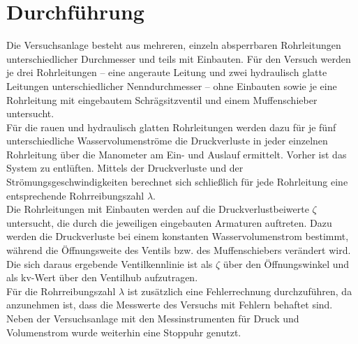 \chapter{Durchführung}
\label{sec:durchfuerung}

Die Versuchsanlage besteht aus mehreren, einzeln absperrbaren Rohrleitungen unterschiedlicher Durchmesser und teils mit Einbauten. Für den Versuch werden je drei Rohrleitungen – eine angeraute Leitung und zwei hydraulisch glatte Leitungen unterschiedlicher Nenndurchmesser – ohne Einbauten sowie je eine Rohrleitung mit eingebautem Schrägsitzventil und einem Muffenschieber untersucht. \\
Für die rauen und hydraulisch glatten Rohrleitungen werden dazu für je fünf unterschiedliche Wasservolumenströme die Druckverluste in jeder einzelnen Rohrleitung über die Manometer am Ein- und Auslauf ermittelt. \linebreak 
Vorher ist das System zu entlüften. Mittels der Druckverluste und der Strömungsgeschwindigkeiten berechnet sich schließlich für jede Rohrleitung eine entsprechende Rohrreibungszahl $\lambda$. \\
Die Rohrleitungen mit Einbauten werden auf die Druckverlustbeiwerte $\zeta$ untersucht, die durch die jeweiligen eingebauten Armaturen auftreten. Dazu werden die Druckverluste bei einem konstanten Wasservolumenstrom bestimmt, während die Öffnungsweite des Ventils bzw. des Muffenschiebers verändert wird. Die sich daraus ergebende Ventilkennlinie ist als $\zeta$ über den Öffnungswinkel und als kv-Wert über den Ventilhub aufzutragen. \\
Für die Rohrreibungszahl $\lambda$ ist zusätzlich eine Fehlerrechnung durchzuführen, da anzunehmen ist, dass die Messwerte des Versuchs mit Fehlern behaftet sind.\\
Neben der Versuchsanlage mit den Messinstrumenten für Druck und Volumenstrom wurde weiterhin eine Stoppuhr genutzt.
